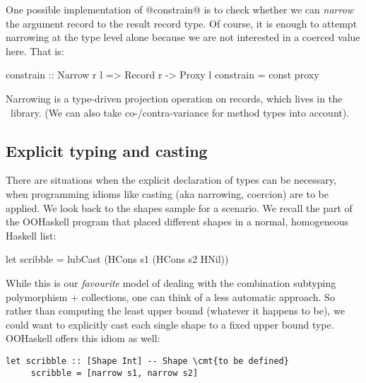 One possible implementation of @constrain@ is to check whether we can
\emph{narrow} the argument record to the result record
type.  Of course, it is enough to attempt narrowing at the type level
alone because we are not interested in a coerced value here. That is:

\begin{code}
 constrain :: Narrow r l => Record r -> Proxy l
 constrain = const proxy
\end{code}

\noindent
Narrowing is a type-driven projection operation on records, which
lives in the \HList\ library. (We can also take co-/contra-variance
for method types into account).





\medskip

\subsection{Explicit typing and casting}

There are situations when the explicit declaration of types can be
necessary, when programming idioms like casting (aka narrowing,
coercion) are to be applied. We look back to the shapes sample for a
scenario. We recall the part of the OOHaskell program that placed
different shapes in a normal, homogeneous Haskell list:

\begin{code}
 let scribble = lubCast (HCons s1 (HCons s2 HNil))
\end{code}

While this is our \emph{favourite} model of dealing with the
combination subtyping polymorphism + collections, one can think of a
less automatic approach. So rather than computing the least upper
bound (whatever it happens to be), we could want to explicitly cast
each single shape to a fixed upper bound type. OOHaskell offers this
idiom as well:

\begin{Verbatim}[fontsize=\small,commandchars=\\\{\}]
 let scribble :: [Shape Int] -- Shape \cmt{to be defined}
     scribble = [narrow s1, narrow s2]
\end{Verbatim}

